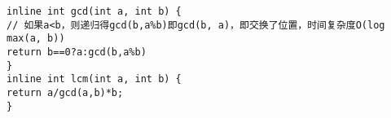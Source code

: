 \documentclass[UTF-8]{article}
\begin{document}
\begin{lstlisting}
inline int gcd(int a, int b) { 
// 如果a<b，则递归得gcd(b,a%b)即gcd(b, a)，即交换了位置，时间复杂度O(log max(a, b))
return b==0?a:gcd(b,a%b)
}
inline int lcm(int a, int b) {
return a/gcd(a,b)*b;
}
\end{lstlisting}
\end{document}
